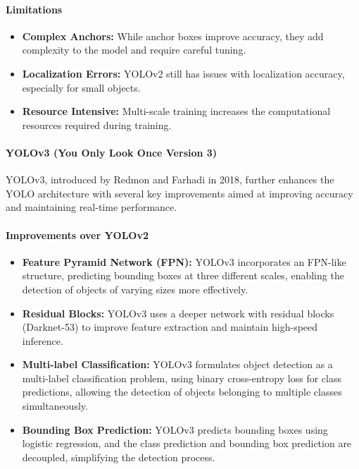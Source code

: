 \documentclass[12pt]{article}
\begin{document}
\paragraph{Limitations}

\begin{itemize}
    \item \textbf{Complex Anchors:} While anchor boxes improve accuracy, they add complexity to the model and require careful tuning.
    
    \item \textbf{Localization Errors:} YOLOv2 still has issues with localization accuracy, especially for small objects.
    
    \item \textbf{Resource Intensive:} Multi-scale training increases the computational resources required during training.
\end{itemize}

\paragraph{YOLOv3 (You Only Look Once Version 3)}

YOLOv3, introduced by Redmon and Farhadi in 2018, further enhances the YOLO architecture with several key improvements aimed at improving accuracy and maintaining real-time performance.

\paragraph{Improvements over YOLOv2}

\begin{itemize}
    \item \textbf{Feature Pyramid Network (FPN):} YOLOv3 incorporates an FPN-like structure, predicting bounding boxes at three different scales, enabling the detection of objects of varying sizes more effectively.

    \item \textbf{Residual Blocks:} YOLOv3 uses a deeper network with residual blocks (Darknet-53) to improve feature extraction and maintain high-speed inference.

    \item \textbf{Multi-label Classification:} YOLOv3 formulates object detection as a multi-label classification problem, using binary cross-entropy loss for class predictions, allowing the detection of objects belonging to multiple classes simultaneously.

    \item \textbf{Bounding Box Prediction:} YOLOv3 predicts bounding boxes using logistic regression, and the class prediction and bounding box prediction are decoupled, simplifying the detection process.
\end{itemize}
\end{document}
